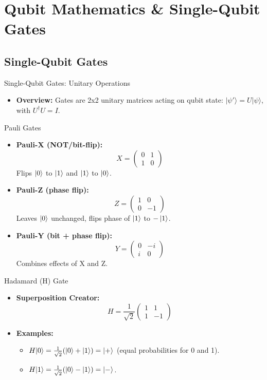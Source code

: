 \documentclass{beamer}
\begin{document}
\section{Qubit Mathematics \& Single-Qubit Gates}

\subsection{Single-Qubit Gates}
\begin{frame}[fragile]{Single-Qubit Gates: Unitary Operations}
    \begin{itemize}
        \item \textbf{Overview:} Gates are 2x2 unitary matrices acting on qubit state: $|\psi'\rangle = U |\psi\rangle$, with $U^\dagger U = I$.
    \end{itemize}
\end{frame}

\begin{frame}[fragile]{Pauli Gates}
    \begin{itemize}
        \item \textbf{Pauli-X (NOT/bit-flip):} 
        \[ X = \begin{pmatrix} 0 & 1 \\ 1 & 0 \end{pmatrix} \]
        Flips $\ket{0}$ to $\ket{1}$ and $\ket{1}$ to $\ket{0}$.
        \item \textbf{Pauli-Z (phase flip):} 
        \[ Z = \begin{pmatrix} 1 & 0 \\ 0 & -1 \end{pmatrix} \]
        Leaves $\ket{0}$ unchanged, flips phase of $\ket{1}$ to $-\ket{1}$.
        \item \textbf{Pauli-Y (bit + phase flip):} 
        \[ Y = \begin{pmatrix} 0 & -i \\ i & 0 \end{pmatrix} \]
        Combines effects of X and Z.
    \end{itemize}
\end{frame}

\begin{frame}[fragile]{Hadamard (H) Gate}
    \begin{itemize}
        \item \textbf{Superposition Creator:} 
        \[ H = \frac{1}{\sqrt{2}} \begin{pmatrix} 1 & 1 \\ 1 & -1 \end{pmatrix} \]
        \item \textbf{Examples:}
        \begin{itemize}
            \item $H|0\rangle = \frac{1}{\sqrt{2}} (|0\rangle + |1\rangle) = \ket{+}$ (equal probabilities for 0 and 1).
            \item $H|1\rangle = \frac{1}{\sqrt{2}} (|0\rangle - |1\rangle) = \ket{-}$.
        \end{itemize}
    \end{itemize}
\end{frame}
\end{document}
